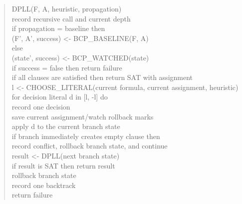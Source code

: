 \documentclass[11pt]{article}
\begin{document}
\begin{quote}
\small
\ttfamily
\raggedright
DPLL(F, A, heuristic, propagation)\\
\hspace*{1em}record recursive call and current depth\\
\hspace*{1em}if propagation = baseline then\\
\hspace*{2em}(F', A', success) <- BCP\_BASELINE(F, A)\\
\hspace*{1em}else\\
\hspace*{2em}(state', success) <- BCP\_WATCHED(state)\\
\hspace*{1em}if success = false then return failure\\
\hspace*{1em}if all clauses are satisfied then return SAT with assignment\\
\hspace*{1em}l <- CHOOSE\_LITERAL(current formula, current assignment, heuristic)\\
\hspace*{1em}for decision literal d in [l, -l] do\\
\hspace*{2em}record one decision\\
\hspace*{2em}save current assignment/watch rollback marks\\
\hspace*{2em}apply d to the current branch state\\
\hspace*{2em}if branch immediately creates empty clause then\\
\hspace*{3em}record conflict, rollback branch state, and continue\\
\hspace*{2em}result <- DPLL(next branch state)\\
\hspace*{2em}if result is SAT then return result\\
\hspace*{2em}rollback branch state\\
\hspace*{2em}record one backtrack\\
\hspace*{1em}return failure
\end{quote}
\end{document}
